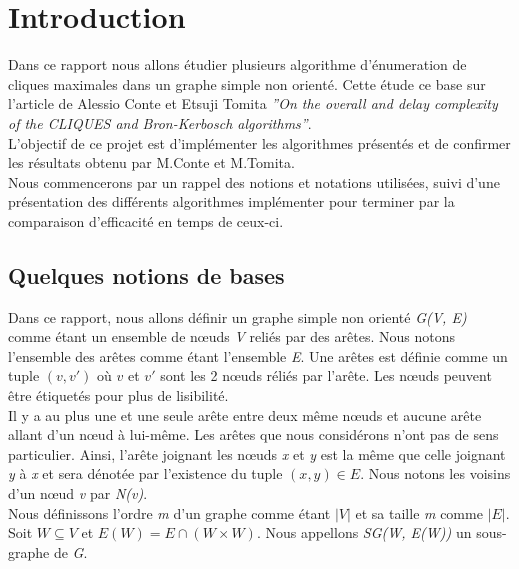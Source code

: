 \documentclass[a4paper, 12pt]{article}
\begin{document}
\tableofcontents

\newpage

\section{Introduction}

Dans ce rapport nous allons étudier plusieurs algorithme d'énumeration de cliques maximales dans un graphe simple non orienté. Cette étude ce base sur l'article de Alessio Conte et Etsuji Tomita  \textit{''On the overall and delay complexity of the CLIQUES and Bron-Kerbosch algorithms''}. \\
L'objectif de ce projet est d'implémenter les algorithmes présentés et de confirmer les résultats obtenu par M.Conte et M.Tomita. \\

Nous commencerons par un rappel des notions et notations utilisées, suivi d'une présentation des différents algorithmes implémenter pour terminer par la comparaison d'efficacité en temps de ceux-ci.

\subsection{Quelques notions de bases} 

Dans ce rapport, nous allons définir un graphe simple non orienté \emph{G(V, E)} comme étant un ensemble de nœuds \emph{V} reliés par des arêtes. Nous notons l'ensemble des arêtes comme étant l'ensemble \emph{E}. Une arêtes est définie comme un tuple $ (v, v') $ où $ v $ et $ v' $ sont les 2 nœuds réliés par l'arête. Les nœuds peuvent être étiquetés pour plus de lisibilité. \\

Il y a au plus une et une seule arête entre deux même nœuds et aucune arête allant d'un nœud à lui-même. Les arêtes que nous considérons n'ont pas de sens particulier. Ainsi, l'arête joignant les nœuds \emph{x} et \emph{y} est la même que celle joignant \emph{y} à \emph{x} et sera dénotée par l'existence du tuple $(x, y) \in E$.
Nous notons les voisins d'un nœud \emph{v} par \emph{N(v)}.\\ 

Nous définissons l'ordre \emph{m} d'un graphe comme étant $ |V| $ et sa taille \emph{m} comme $ |E| $. \\

Soit $ W \subseteq V $ et $ E(W) = E \cap (W \times W) $. Nous appellons \emph{SG(W, E(W))} un sous-graphe de \emph{G}.
\end{document}
